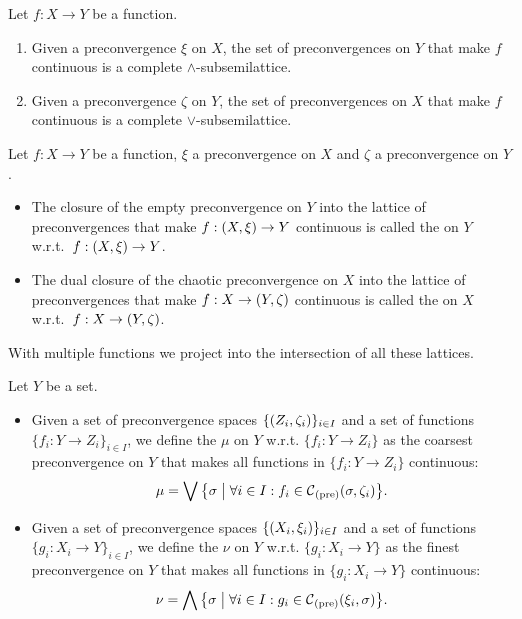 \begin{corollary}
Let $f: X\to Y$ be a function.
\begin{enumerate}
\item Given a preconvergence $\xi$ on $X$, the set of preconvergences on $Y$ that make $f$ continuous is a complete $\wedge$-subsemilattice.
\item Given a preconvergence $\zeta$ on $Y$, the set of preconvergences on $X$ that make $f$ continuous is a complete $\vee$-subsemilattice.
\end{enumerate}
\end{corollary}

\begin{definition}
Let $f: X\to Y$ be a function, $\xi$ a preconvergence on $X$ and $\zeta$ a preconvergence on $Y$.
\begin{itemize}
\item The closure of the empty preconvergence on $Y$ into the lattice of preconvergences that make $f:\left( X,\xi \right)\to Y$ continuous is called the  on $Y$ w.r.t.\ $f:\left( X,\xi \right)\to Y$.
\item The dual closure of the chaotic preconvergence on $X$ into the lattice of preconvergences that make $f:X\to \left( Y,\zeta \right)$ continuous is called the  on $X$ w.r.t.\ $f:X\to \left( Y,\zeta \right)$.
\end{itemize}
\end{definition}

With multiple functions we project into the intersection of all these lattices.

\begin{definition}
Let $Y$ be a set.
\begin{itemize}
\item Given a set of preconvergence spaces $\{\left( Z_i,\zeta_i \right)\}_{i\in I}$ and a set of functions $\{f_i: Y\to Z_i\}_{i\in I}$, we define the  $\mu$ on $Y$ w.r.t. $\{f_i: Y\to Z_i\}$ as the coarsest preconvergence on $Y$ that makes all functions in $\{f_i: Y\to Z_i\}$ continuous:
\[ \mu = \bigvee \setbuilder{\sigma}{\forall i\in I: f_i\in  \cont_\text{(pre)}(\sigma, \zeta_i)}. \]
\item Given a set of preconvergence spaces $\{\left( X_i,\xi_i \right)\}_{i\in I}$ and a set of functions $\{g_i: X_i \to Y\}_{i\in I}$, we define the  $\nu$ on $Y$ w.r.t. $\{g_i: X_i\to Y\}$ as the finest preconvergence on $Y$ that makes all functions in $\{g_i: X_i \to Y\}$ continuous:
\[ \nu = \bigwedge \setbuilder{\sigma}{\forall i\in I: g_i\in  \cont_\text{(pre)}(\xi_i, \sigma)}. \]
\end{itemize}
\end{definition}

